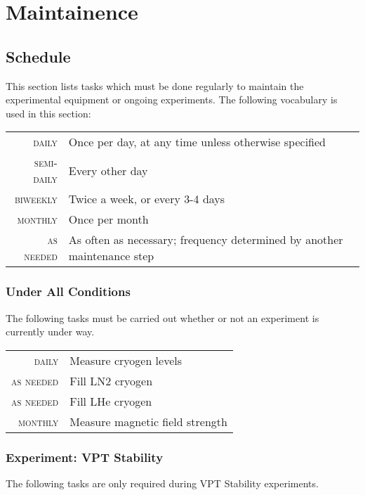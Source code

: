 \chapter{Maintainence}
\label{sec:op_maintenance}

\section{Schedule}
\label{sec:op_maintenance:schedule}

This section lists tasks which must be done regularly to maintain the experimental equipment or ongoing experiments.  The following vocabulary is used in this section:
\begin{table}[h]\begin{tabular}{>{\scshape}r p{\textwidth}}
    daily & Once per day, at any time unless otherwise specified\\
    semi-daily & Every other day\\
    biweekly & Twice a week, or every 3-4 days\\
    monthly & Once per month\\
    as needed & As often as necessary; frequency determined by another maintenance step\\
\end{tabular}\end{table}

\subsection{Under All Conditions}
\label{sec:op_maintenance:always}
The following tasks must be carried out whether or not an experiment is currently under way.  

\begin{table}[h]\begin{tabular}{>{\scshape}r p{\textwidth}}
    daily & Measure cryogen levels\\
    as needed & Fill LN2 cryogen\\
    as needed & Fill LHe cryogen\\
    monthly & Measure magnetic field strength    
\end{tabular}\end{table}

\subsection{Experiment: VPT Stability}
\label{sec:op_maintenance:ex_vpt_stability}
The following tasks are only required during VPT Stability experiments.

